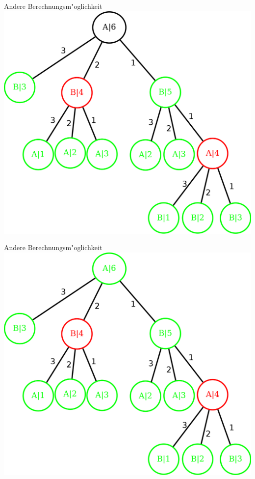 \documentclass[18pt]{beamer}
\begin{document}
\begin{frame}{Andere Berechnungsm"oglichkeit}
\includegraphics[scale=0.4]{baum7.png}
\end{frame}

\begin{frame}{Andere Berechnungsm"oglichkeit}
\includegraphics[scale=0.4]{baum8.png}
\end{frame}
\end{document}
